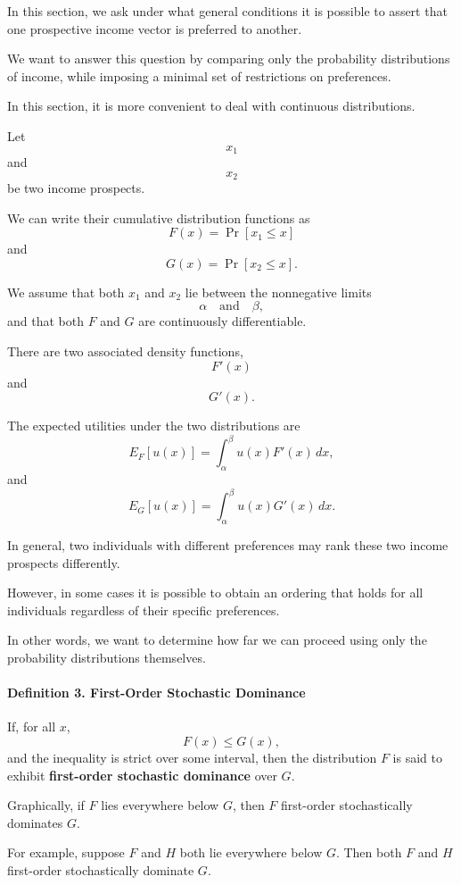 In this section, we ask under what general conditions it is possible to assert that one prospective income vector is preferred to another.

We want to answer this question by comparing only the probability distributions of income, while imposing a minimal set of restrictions on preferences.

In this section, it is more convenient to deal with continuous distributions.

Let
\[
x_1
\]
and
\[
x_2
\]
be two income prospects.

We can write their cumulative distribution functions as
\[
F(x)=\Pr[x_1\le x]
\]
and
\[
G(x)=\Pr[x_2\le x].
\]

We assume that both \(x_1\) and \(x_2\) lie between the nonnegative limits
\[
\alpha
\quad
\text{and}
\quad
\beta,
\]
and that both \(F\) and \(G\) are continuously differentiable.



There are two associated density functions,
\[
F'(x)
\]
and
\[
G'(x).
\]

The expected utilities under the two distributions are
\[
E_F[u(x)]
=
\int_{\alpha}^{\beta}
u(x)F'(x)\,dx,
\]
and
\[
E_G[u(x)]
=
\int_{\alpha}^{\beta}
u(x)G'(x)\,dx.
\]

In general, two individuals with different preferences may rank these two income prospects differently.

However, in some cases it is possible to obtain an ordering that holds for all individuals regardless of their specific preferences.

In other words, we want to determine how far we can proceed using only the probability distributions themselves.

\paragraph{Definition 3. First-Order Stochastic Dominance}

If, for all \(x\),
\[
F(x)\le G(x),
\]
and the inequality is strict over some interval, then the distribution \(F\) is said to exhibit \textbf{first-order stochastic dominance} over \(G\).

Graphically, if \(F\) lies everywhere below \(G\), then \(F\) first-order stochastically dominates \(G\).

For example, suppose \(F\) and \(H\) both lie everywhere below \(G\). Then both \(F\) and \(H\) first-order stochastically dominate \(G\).

